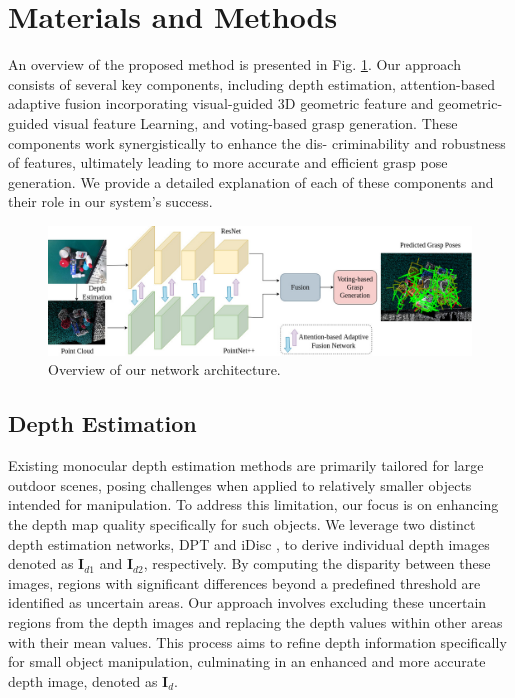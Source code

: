 \section{Materials and Methods}
\label{sec:methodology}

An overview of the proposed method is presented in Fig. \ref{fig:Overview}. Our approach consists of several key components, including depth estimation, attention-based adaptive fusion incorporating visual-guided 3D geometric feature and geometric-guided visual feature Learning, and voting-based grasp generation. These components work synergistically to enhance the dis- criminability and robustness of features, ultimately leading to more accurate and efficient grasp pose generation. We provide a detailed explanation of each of these components and their role in our system’s success.


\begin{figure}[h!]
	\centering
	\includegraphics[width=0.98\linewidth]{figs/overview}
	\caption{Overview of our network architecture.}
	\label{fig:Overview}
\end{figure}

\subsection{Depth Estimation}

Existing monocular depth estimation methods are primarily tailored for large outdoor scenes, posing challenges when applied to relatively smaller objects intended for manipulation. To address this limitation, our focus is on enhancing the depth map quality specifically for such objects. We leverage two distinct depth estimation networks, DPT \cite{ranftl2021vision} and iDisc \cite{piccinelli2023idisc}, to derive individual depth images denoted as $\mathbf{I}_{d1}$ and $\mathbf{I}_{d2}$, respectively. By computing the disparity between these images, regions with significant differences beyond a predefined threshold are identified as uncertain areas. Our approach involves excluding these uncertain regions from the depth images and replacing the depth values within other areas with their mean values. This process aims to refine depth information specifically for small object manipulation, culminating in an enhanced and more accurate depth image, denoted as $\mathbf{I}_{d}$.

